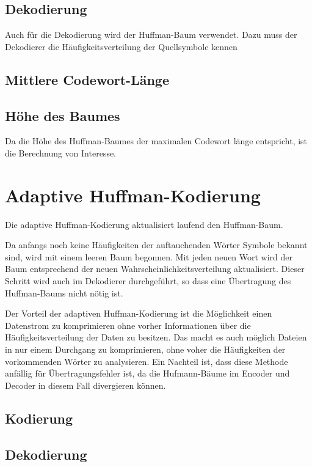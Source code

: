 \documentclass[twoside,11pt,a4paper]{article}
\theoremstyle{break}
\begin{document}
\subsection{Dekodierung}
Auch für die Dekodierung wird der Huffman-Baum verwendet. Dazu muss der
Dekodierer die Häufigkeitsverteilung der Quellsymbole kennen

\subsection{Mittlere Codewort-Länge}

\subsection{Höhe des Baumes}

Da die Höhe des Huffman-Baumes der maximalen Codewort länge entspricht,
ist die Berechnung von Interesse.

\section{Adaptive Huffman-Kodierung}

Die adaptive Huffman-Kodierung aktualisiert laufend den Huffman-Baum.

Da anfangs noch keine Häufigkeiten der auftauchenden Wörter Symbole bekannt
sind, wird mit einem leeren Baum begonnen. Mit jeden neuen Wort wird der Baum
entsprechend der neuen Wahrscheinlichkeitsverteilung aktualisiert. Dieser
Schritt wird auch im Dekodierer durchgeführt, so dass eine Übertragung des
Huffman-Baums nicht nötig ist.

Der Vorteil der adaptiven Huffman-Kodierung ist die Möglichkeit einen Datenstrom
zu komprimieren ohne vorher Informationen über die Häufigkeitsverteilung der
Daten zu besitzen. Das macht es auch möglich Dateien in nur einem Durchgang zu
komprimieren, ohne voher die Häufigkeiten der vorkommenden Wörter zu
analysieren. Ein Nachteil ist, dass diese Methode anfällig für
Übertragungsfehler ist, da die Hufmann-Bäume im Encoder und Decoder in diesem
Fall divergieren können.

\subsection{Kodierung}

\subsection{Dekodierung}
\end{document}
